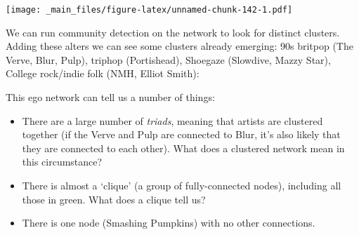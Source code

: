 \documentclass[
]{book}
\newenvironment{Shaded}{\begin{snugshade}}{\end{snugshade}}
\newcommand{\AttributeTok}[1]{\textcolor[rgb]{0.77,0.63,0.00}{#1}}
\newcommand{\DecValTok}[1]{\textcolor[rgb]{0.00,0.00,0.81}{#1}}
\newcommand{\FunctionTok}[1]{\textcolor[rgb]{0.00,0.00,0.00}{#1}}
\newcommand{\NormalTok}[1]{#1}
\newcommand{\SpecialCharTok}[1]{\textcolor[rgb]{0.00,0.00,0.00}{#1}}
\newcommand{\StringTok}[1]{\textcolor[rgb]{0.31,0.60,0.02}{#1}}
\begin{document}
\begin{Shaded}
\end{Shaded}

\texttt{[image: \_main\_files/figure-latex/unnamed-chunk-142-1.pdf]}

We can run community detection on the network to look for distinct clusters. Adding these alters we can see some clusters already emerging: 90s britpop (The Verve, Blur, Pulp), triphop (Portishead), Shoegaze (Slowdive, Mazzy Star), College rock/indie folk (NMH, Elliot Smith):

This ego network can tell us a number of things:

\begin{itemize}
\item
  There are a large number of \emph{triads}, meaning that artists are clustered together (if the Verve and Pulp are connected to Blur, it's also likely that they are connected to each other). What does a clustered network mean in this circumstance?
\item
  There is almost a `clique' (a group of fully-connected nodes), including all those in green. What does a clique tell us?
\item
  There is one node (Smashing Pumpkins) with no other connections.
\end{itemize}
\end{document}
